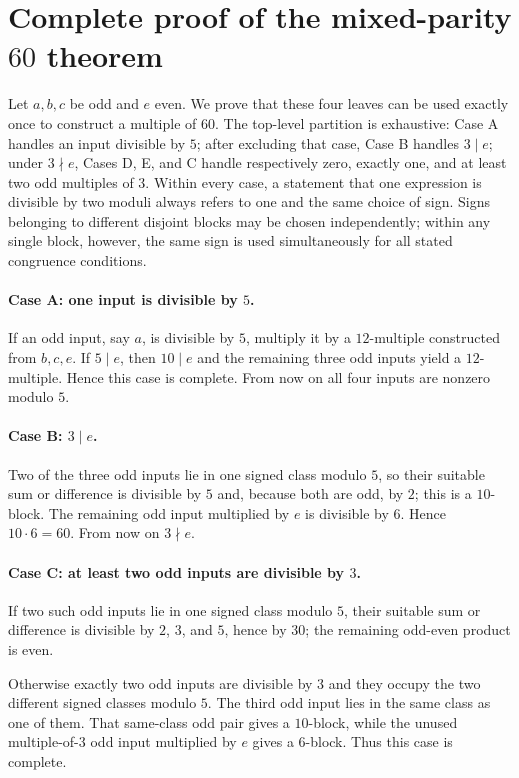 \section{Complete proof of the mixed-parity \texorpdfstring{$60$}{60} theorem}\label{app:mixed60}

Let $a,b,c$ be odd and $e$ even.  We prove that these four leaves can be
used exactly once to construct a multiple of $60$.  The top-level partition
is exhaustive: Case A handles an input divisible by $5$; after excluding
that case, Case B handles $3\mid e$; under $3\nmid e$, Cases D, E, and C
handle respectively zero, exactly one, and at least two odd multiples of
$3$.  Within every case, a statement that one expression is divisible by two
moduli always refers to one and the same choice of sign.  Signs belonging to
different disjoint blocks may be chosen independently; within any single
block, however, the same sign is used simultaneously for all stated
congruence conditions.

\paragraph{Case A: one input is divisible by $5$.}
If an odd input, say $a$, is divisible by $5$, multiply it by a
$12$-multiple constructed from $b,c,e$.  If $5\mid e$, then $10\mid e$ and
the remaining three odd inputs yield a $12$-multiple.  Hence this case is
complete.  From now on all four inputs are nonzero modulo $5$.

\paragraph{Case B: $3\mid e$.}
Two of the three odd inputs lie in one signed class modulo $5$, so their
suitable sum or difference is divisible by $5$ and, because both are odd, by
$2$; this is a $10$-block.  The remaining odd input multiplied by $e$ is
divisible by $6$.  Hence $10\cdot6=60$.  From now on $3\nmid e$.

\paragraph{Case C: at least two odd inputs are divisible by $3$.}
If two such odd inputs lie in one signed class modulo $5$, their suitable sum
or difference is divisible by $2$, $3$, and $5$, hence by $30$; the
remaining odd-even product is even.

Otherwise exactly two odd inputs are divisible by $3$ and they occupy the
two different signed classes modulo $5$.  The third odd input lies in the
same class as one of them.  That same-class odd pair gives a $10$-block,
while the unused multiple-of-$3$ odd input multiplied by $e$ gives a
$6$-block.  Thus this case is complete.

